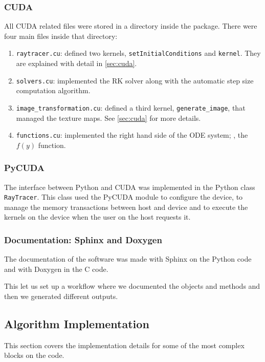 \subsubsection*{CUDA}

All \ac{CUDA} related files were stored in a directory inside the package. There were four main files inside that directory:
\begin{enumerate}
	\item \lstinline{raytracer.cu}: defined two kernels, \lstinline{setInitialConditions} and \lstinline{kernel}. They are explained with detail in \autoref{sec:cuda}.
	\item \lstinline{solvers.cu}: implemented the \ac{RK} solver along with the automatic step size computation algorithm.
	\item \lstinline{image_transformation.cu}: defined a third kernel, \lstinline{generate_image}, that managed the texture maps. See \autoref{sec:cuda} for more details.
	\item \lstinline{functions.cu}: implemented the right hand side of the \ac{ODE} system; \ie, the $f(y)$ function.
\end{enumerate}

\subsubsection*{PyCUDA}

The interface between Python and \ac{CUDA} was implemented in the Python class \lstinline{RayTracer}. This class used the PyCUDA module to configure the device, to manage the memory transactions between host and device and to execute the kernels on the device when the user on the host requests it.

\subsubsection*{Documentation: Sphinx and Doxygen}

The documentation of the software was made with Sphinx on the Python code and with Doxygen in the C code.

This let us set up a workflow where we documented the objects and methods and then we generated different outputs.

\subsection{Algorithm Implementation}

This section covers the implementation details for some of the most complex blocks on the code.

